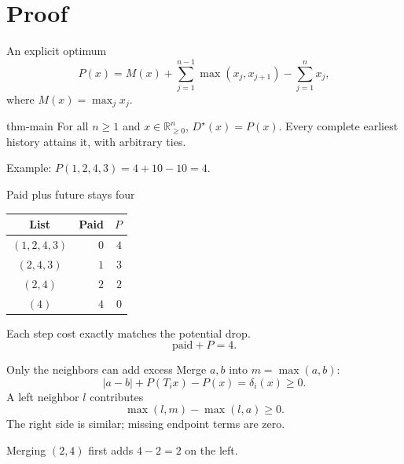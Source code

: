 \documentclass{beamer}
\begin{document}
\section{Proof}
\begin{frame}{An explicit optimum}
\[
P(x)=M(x)+\sum_{j=1}^{n-1}\max(x_j,x_{j+1})-\sum_{j=1}^n x_j,
\]
where $M(x)=\max_jx_j$.
\begin{bookresult}{thm-main}
For all $n\geq1$ and $x\in\mathbb R_{\geq0}^n$, $D^{\star}(x)=P(x)$. Every complete earliest history attains it, with arbitrary ties.
\end{bookresult}
Example: $P(1,2,4,3)=4+10-10=4$.
\end{frame}
\begin{frame}{Paid plus future stays four}
\centering
\begin{tabular}{c|r|r}
List & Paid & $P$\\\hline
$(1,2,4,3)$ & $0$ & $4$\\
$(2,4,3)$ & $1$ & $3$\\
$(2,4)$ & $2$ & $2$\\
$(4)$ & $4$ & $0$
\end{tabular}
\bigskip

Each step cost exactly matches the potential drop.
\[
\text{paid}+P=4.
\]
\end{frame}
\begin{frame}{Only the neighbors can add excess}
Merge $a,b$ into $m=\max(a,b)$:
\[
|a-b|+P(T_i x)-P(x)=\delta_i(x)\geq0.
\]
A left neighbor $l$ contributes
\[
\max(l,m)-\max(l,a)\geq0.
\]
The right side is similar; missing endpoint terms are zero.

Merging $(2,4)$ first adds $4-2=2$ on the left.
\end{frame}
\end{document}
